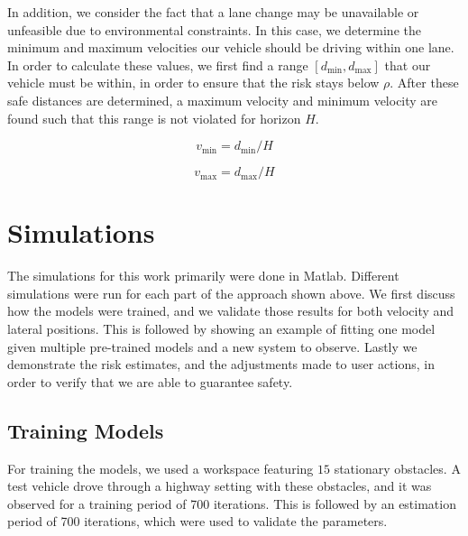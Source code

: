 \documentclass[letterpaper, 10 pt, conference]{ieeeconf}  %
\begin{document}
In addition, we consider the fact that a lane change may be unavailable or unfeasible due to environmental constraints. In this case, we determine the minimum and maximum velocities our vehicle should be driving within one lane. In order to calculate these values, we first find a range $[d_{\min},d_{\max}]$ that our vehicle must be within, in order to ensure that the risk stays below $\rho$. After these safe distances are determined, a maximum velocity and minimum velocity are found such that this range is not violated for horizon $H$.

\begin{equation}
    v_{\min} = d_{\min}/H
\end{equation}

\begin{equation}
    v_{\max} = d_{\max}/H
\end{equation}



\section{Simulations} \label{sec:sims}
The simulations for this work primarily were done in Matlab. Different simulations were run for each part of the approach shown above. We first discuss how the models were trained, and we validate those results for both velocity and lateral positions. This is followed by showing an example of fitting one model given multiple pre-trained models and a new system to observe. Lastly we demonstrate the risk estimates, and the adjustments made to user actions, in order to verify that we are able to guarantee safety.

\subsection{Training Models}
For training the models, we used a workspace featuring $15$ stationary obstacles. A test vehicle drove through a highway setting with these obstacles, and it was observed for a training period of 700 iterations. This is followed by an estimation period of 700 iterations, which were used to validate the parameters.
\end{document}
